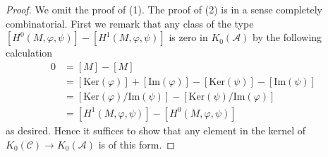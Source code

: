 \begin{proof}
We omit the proof of (1). The proof of (2) is in a sense completely
combinatorial. First we remark that any class of the type
$[H^0(M, \varphi, \psi)] - [H^1(M, \varphi, \psi)]$ is zero
in $K_0(\mathcal{A})$ by the following calculation
\begin{align*}
0 & = [M] - [M] \\
& =  [\text{Ker}(\varphi)] + [\text{Im}(\varphi)]
- [\text{Ker}(\psi)] - [\text{Im}(\psi)] \\
& =
[\text{Ker}(\varphi)/\text{Im}(\psi)] -
[\text{Ker}(\psi)/\text{Im}(\varphi)] \\
& = [H^1(M, \varphi, \psi)] - [H^0(M, \varphi, \psi)]
\end{align*}
as desired. Hence it suffices to show that any element in the kernel
of $K_0(\mathcal{C}) \to K_0(\mathcal{A})$ is of this form.


\end{proof}
